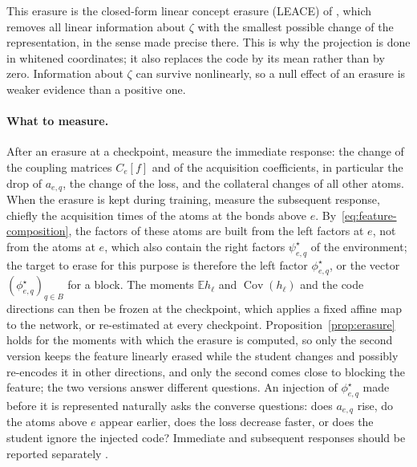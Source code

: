 \documentclass[11pt]{article}
\newcommand{\E}{\mathbb{E}}
\newcommand{\Cov}{\operatorname{Cov}}
\theoremstyle{definition}
\numberwithin{equation}{section}
\begin{document}
This erasure is the closed-form linear concept erasure (LEACE) of \citet{belrose2023leace}, which removes all linear information about $\zeta$ with the smallest possible change of the representation, in the sense made precise there. This is why the projection is done in whitened coordinates; it also replaces the code by its mean rather than by zero. Information about $\zeta$ can survive nonlinearly, so a null effect of an erasure is weaker evidence than a positive one.

\paragraph{What to measure.}
After an erasure at a checkpoint, measure the immediate response: the change of the coupling matrices $C_e[f]$ and of the acquisition coefficients, in particular the drop of $a_{e,q}$, the change of the loss, and the collateral changes of all other atoms. When the erasure is kept during training, measure the subsequent response, chiefly the acquisition times of the atoms at the bonds above $e$. By~\eqref{eq:feature-composition}, the factors of these atoms are built from the left factors at $e$, not from the atoms at $e$, which also contain the right factors $\psi^\star_{e,q}$ of the environment; the target to erase for this purpose is therefore the left factor $\phi^\star_{e,q}$, or the vector $(\phi^\star_{e,q})_{q\in B}$ for a block. The moments $\E h_\ell$ and $\Cov(h_\ell)$ and the code directions can then be frozen at the checkpoint, which applies a fixed affine map to the network, or re-estimated at every checkpoint. Proposition~\ref{prop:erasure} holds for the moments with which the erasure is computed, so only the second version keeps the feature linearly erased while the student changes and possibly re-encodes it in other directions, and only the second comes close to blocking the feature; the two versions answer different questions. An injection of $\phi^\star_{e,q}$ made before it is represented naturally asks the converse questions: does $a_{e,q}$ rise, do the atoms above $e$ appear earlier, does the loss decrease faster, or does the student ignore the injected code? Immediate and subsequent responses should be reported separately \citep[Section~7.6]{hfl_surrogate}.
\end{document}
